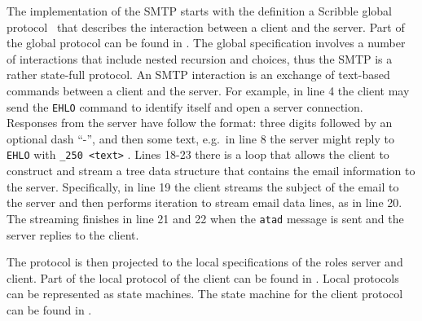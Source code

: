
The implementation of the SMTP starts with
the definition a Scribble global protocol~\cite{HuR:smtp}
that describes the interaction between a client and the server.
Part of the global protocol can be found in .
The global specification involves a number of interactions
that include nested recursion and choices, thus the SMTP
is a rather state-full protocol.
%
An SMTP interaction is an exchange of text-based {commands}
between a client and the server.
%
For example, in line 4 the client may send the
\lstinline|EHLO| command to identify itself and open a server connection.
Responses from the server have follow  the format:
three digits followed by an optional dash ``-'', and then some text,
e.g.~in line 8 the server might reply to \lstinline|EHLO| with \lstinline|_250 <text>| .
%
%
%
Lines 18-23 there is a loop that allows the client to construct
and stream a tree data structure that contains the email information
to the server. Specifically, in line 19 the client streams the subject of the
email to the server and then performs iteration to stream email data lines,
as in line 20. The streaming finishes in line 21 and 22 when the
\lstinline|atad| message is sent and the server replies to the client.

The protocol is then projected to the local specifications
of the roles server and client. Part of the local protocol
of the client can be found in .
Local protocols can be represented as state machines. The state
machine for the client protocol can be found in .

